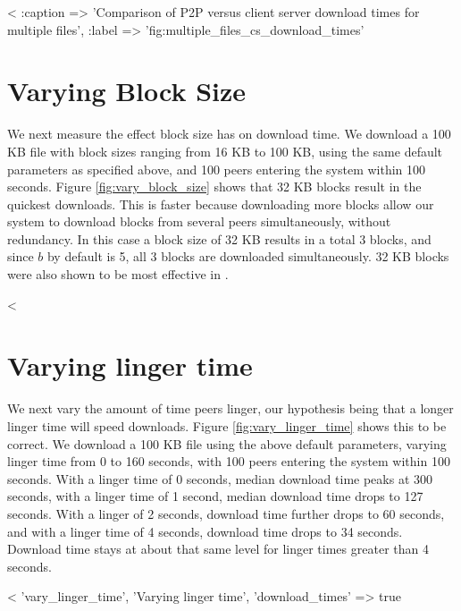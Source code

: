 <%
  :caption => 'Comparison of P2P versus client server download times for multiple files', :label => 'fig:multiple_files_cs_download_times' %

\section{Varying Block Size}

We next measure the effect block size has on download time. We download a 100 KB file with block sizes ranging from 
16 KB to 100 KB, using the same default parameters as specified above, and 100 peers entering the system within 100 seconds.  
Figure \ref{fig:vary_block_size} shows that 32 KB blocks result
in the quickest downloads.  This is faster because downloading more blocks allow our system to download 
blocks from several peers simultaneously, without redundancy.  In this case a block size of 32 KB results in a total 3 blocks, and since $b$ by default is 5, all 3 blocks
are downloaded simultaneously. 32 KB blocks were also shown to be most effective in \cite{32_kb_blocks}.

<%

\section{Varying linger time}

We next vary the amount of time peers linger, our hypothesis being that a longer linger 
time will speed downloads.  Figure \ref{fig:vary_linger_time} shows this to be correct.
We download a 100 KB file using the above default parameters, varying linger time from 0 to 160 seconds, with 100 peers entering the system within 100 seconds.
With a linger time of 0 seconds, median download time peaks at 300 seconds, with 
a linger time of 1 second, median download time drops to 127 seconds.  With a linger of 2 seconds, download time further drops to 60 seconds, and
with a linger time of 4 seconds, download time drops to 34 seconds.  Download time stays at about that same level for linger times greater than 4 seconds.

<%
 'vary_linger_time', 'Varying linger time', 'download_times' => true  %

